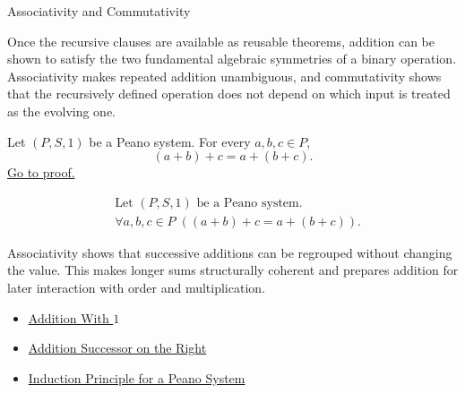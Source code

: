 \begin{topicbox}{Associativity and Commutativity}
\begin{exposition}
Once the recursive clauses are available as reusable theorems, addition can be
shown to satisfy the two fundamental algebraic symmetries of a binary
operation. Associativity makes repeated addition unambiguous, and
commutativity shows that the recursively defined operation does not depend on
which input is treated as the evolving one.
\end{exposition}

\begin{tcolorbox}[colback=thmbox, colframe=thmborder, arc=2pt,
  left=6pt, right=6pt, top=4pt, bottom=4pt,
  title={\small\textbf{Theorem (Addition Is Associative)}},
  fonttitle=\small\bfseries]
\begin{theorem}
\label{thm:addition-associative}
Let $(P,S,1)$ be a Peano system. For every $a,b,c \in P$,
\[
(a+b)+c=a+(b+c).
\]
\hyperref[prf:addition-associative]{Go to proof.}
\end{theorem}
\end{tcolorbox}

\begin{remark*}
\[
\begin{aligned}
&\text{Let } (P,S,1) \text{ be a Peano system.}\\
&\forall a,b,c \in P\;((a+b)+c=a+(b+c)).
\end{aligned}
\]
\end{remark*}

\begin{remark*}[Interpretation]
Associativity shows that successive additions can be regrouped without
changing the value. This makes longer sums structurally coherent and prepares
addition for later interaction with order and multiplication.
\end{remark*}

\begin{dependencies}
\begin{itemize}
  \item \hyperref[thm:addition-with-one]{Addition With $1$}
  \item \hyperref[thm:addition-successor-on-right]{Addition Successor on the Right}
  \item \hyperref[thm:induction-principle-for-peano-system]{Induction Principle for a Peano System}
\end{itemize}
\end{dependencies}


\end{topicbox}

